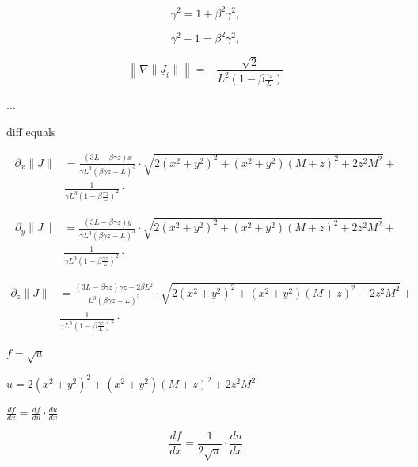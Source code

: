 \begin{equation}
		\gamma^2 = 1+\beta^2\gamma^2,
\end{equation}

\begin{equation}
		\gamma^2 - 1 = \beta^2\gamma^2,
\end{equation}

\begin{equation}
	\left\| \nabla \|\underline{J}_t\| \right\|
	= - \frac{ \sqrt{2} }{ L^2 ( 1 - \beta \frac{\gamma z}{L}) }
\end{equation}

...

diff equals

\begin{equation}
	\begin{aligned}
	\partial_x \| J\| &= \frac{(3L-\beta\gamma z)x}{\gamma L^3(\beta\gamma z - L)^3} \cdot \sqrt{ 2 ( x^2+ y^2 )^2 + (x^2+y^2)(M+z)^2 + 2 z^2 M^2 } +  \\
	& \frac{1}{\gamma L^3 (1-\beta\frac{\gamma z}{L})^2} \cdot
	\end{aligned}
\end{equation}

\begin{equation}
	\begin{aligned}
	\partial_y \| J\| &= \frac{(3L-\beta\gamma z)y}{\gamma L^3(\beta\gamma z - L)^3} \cdot \sqrt{ 2 ( x^2+ y^2 )^2 + (x^2+y^2)(M+z)^2 + 2 z^2 M^2 } +  \\
	& \frac{1}{\gamma L^3 (1-\beta\frac{\gamma z}{L})^2} \cdot
	\end{aligned}
\end{equation}

\begin{equation}
	\begin{aligned}
	\partial_z \| J\| &= \frac{(3L-\beta\gamma z)\gamma z - 2\beta L^2}{ L^3(\beta\gamma z - L)^3} \cdot \sqrt{ 2 ( x^2+ y^2 )^2 + (x^2+y^2)(M+z)^2 + 2 z^2 M^2 } +  \\
	& \frac{1}{\gamma L^3 (1-\beta\frac{\gamma z}{L})^2} \cdot
	\end{aligned}
\end{equation}

$f=\sqrt{u}$

$u=2 ( x^2+ y^2 )^2 + (x^2+y^2)(M+z)^2 + 2 z^2 M^2 $

$\frac{df}{dx}=\frac{df}{du}\cdot \frac{du}{dx}$

\begin{equation}
	\frac{df}{dx} = \frac{1}{2\sqrt{u}} \cdot \frac{du}{dx}
\end{equation}

